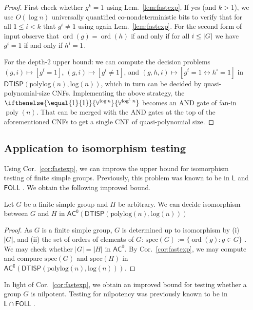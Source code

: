 \documentclass{theoretics}
\newcommand{\ord}[1]{\operatorname{ord}(#1)}
\newcommand{\alphacc}[1]{\ifthenelse{\equal{#1}{1}}{\forall^{\log n}}{\forall^{\log^{#1}n}}} %
\newcommand{\abs}[1]{\left|\mathinner{#1}\right|}
\newcommand{\Lem}[1]{Lem.~\ref{#1}\xspace}
\newcommand{\Cor}[1]{Cor.~\ref{#1}\xspace}
\DeclareMathOperator{\poly}{poly}
\newcommand*{\ComplexityClass}[1]{\ensuremath{\mathsf{#1}}\xspace}
\newcommand{\DTISP}{\ComplexityClass{DTISP}}
\newcommand{\DTISPpll}{\ensuremath{\DTISP(\mathrm{polylog}(n),\mathrm{log}(n))}\xspace}
\newcommand*{\LogSpace}{\ComplexityClass{L}}
\newcommand{\AC}{\ComplexityClass{AC}}
\newcommand{\ACz}{\ComplexityClass{AC^0}}
\begin{document}
\begin{proof}
First check whether $g^k = 1$ using \Lem{lem:fastexp}. If yes (and $k > 1$), we use $O(\log n)$ universally quantified co-nondeterministic bits to verify that for all $1 \leq i < k$ that $g^{i} \neq 1$ using again  \Lem{lem:fastexp}. For the second form of input observe that $\ord{g} = \ord{h}$ if and only if for all $i \leq \abs{G}$ we have $g^i = 1$ if and only if $h^i=1$. 

For the depth-2 upper bound: we can compute the decision problems $(g,i) \mapsto [g^i = 1]$, $(g,i) \mapsto [g^i \neq 1]$, and $(g,h,i) \mapsto [g^i=1 \leftrightarrow h^i=1]$ in $\DTISPpll$, which in turn can be decided by quasi-polynomial-size CNFs. Implementing the above strategy, the $\alphacc{1}$ becomes an AND gate of fan-in $\poly(n)$. That can be merged with the AND gates at the top of the aforementioned CNFs to get a single CNF of quasi-polynomial size. \qedhere
\end{proof}

\subsection{Application to isomorphism testing}
Using \Cor{cor:fastexp}, we can improve the upper bound for isomorphism testing of finite simple groups. Previously, this problem was known to be in $\LogSpace$ \cite{TangThesis} and $\mathsf{FOLL}$ \cite{GrochowLevetWL}. We obtain the following improved bound.

\begin{corollary} \label{cor:simple}
Let $G$ be a finite simple group and $H$ be arbitrary. We can decide isomorphism between $G$ and $H$ in $\ACz(\DTISPpll)$ 
\end{corollary}

\begin{proof}
 As $G$ is a finite simple group, $G$ is determined up to isomorphism by (i) $|G|$, and (ii) the set of orders of elements of $G$: $\text{spec}(G) := \{ \ord{g} : g \in G \}$ \cite{SimpleOrder}. We may check whether $|G| = |H|$ in $\AC^{0}$. By \Cor{cor:fastexp}, we may compute and compare $\text{spec}(G)$ and $\text{spec}(H)$ in $\ACz(\DTISPpll)$. \qedhere 
\end{proof}


In light of \Cor{cor:fastexp}, we obtain an improved bound for testing whether a group $G$ is nilpotent. Testing for nilpotency was previously known to be in  $\LogSpace \cap \mathsf{FOLL}$ \cite{BKLM}.
\end{document}
